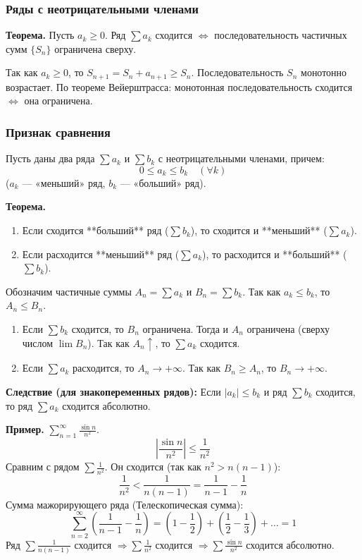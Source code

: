 \subsubsection*{Ряды с неотрицательными членами}
\textbf{Теорема.} Пусть $a_k \ge 0$. Ряд $\sum a_k$ сходится $\Leftrightarrow$ последовательность частичных сумм $\{S_n\}$ ограничена сверху.
\begin{tcolorbox}[title=Доказательство]
    Так как $a_k \ge 0$, то $S_{n+1} = S_n + a_{n+1} \ge S_n$.
    Последовательность $S_n$ монотонно возрастает.
    По теореме Вейерштрасса: монотонная последовательность сходится $\Leftrightarrow$ она ограничена.
\end{tcolorbox}

\subsubsection*{Признак сравнения}
Пусть даны два ряда $\sum a_k$ и $\sum b_k$ с неотрицательными членами, причем:
\[ 0 \le a_k \le b_k \quad (\forall k) \]
($a_k$ — «меньший» ряд, $b_k$ — «больший» ряд).

\textbf{Теорема.}
\begin{enumerate}
    \item Если сходится **больший** ряд ($\sum b_k$), то сходится и **меньший** ($\sum a_k$).
    \item Если расходится **меньший** ряд ($\sum a_k$), то расходится и **больший** ($\sum b_k$).
\end{enumerate}

\begin{tcolorbox}[title=Доказательство]
    Обозначим частичные суммы $A_n = \sum a_k$ и $B_n = \sum b_k$.
    Так как $a_k \le b_k$, то $A_n \le B_n$.
    \begin{enumerate}
        \item Если $\sum b_k$ сходится, то $B_n$ ограничена. Тогда и $A_n$ ограничена (сверху числом $\lim B_n$). Так как $A_n \uparrow$, то $\sum a_k$ сходится.
        \item Если $\sum a_k$ расходится, то $A_n \to +\infty$. Так как $B_n \ge A_n$, то $B_n \to +\infty$.
    \end{enumerate}
\end{tcolorbox}
 
\textbf{Следствие (для знакопеременных рядов):}
Если $|a_k| \le b_k$ и ряд $\sum b_k$ сходится, то ряд $\sum a_k$ сходится абсолютно.

\textbf{Пример.} $\sum_{n=1}^\infty \frac{\sin n}{n^2}$.
\[ \left| \frac{\sin n}{n^2} \right| \le \frac{1}{n^2} \]
Сравним с рядом $\sum \frac{1}{n^2}$. Он сходится (так как $n^2 > n(n-1)$):
\[ \frac{1}{n^2} < \frac{1}{n(n-1)} = \frac{1}{n-1} - \frac{1}{n} \]
Сумма мажорирующего ряда (Телескопическая сумма):
\[ \sum_{n=2}^\infty \left(\frac{1}{n-1} - \frac{1}{n}\right) = \left(1 - \frac{1}{2}\right) + \left(\frac{1}{2} - \frac{1}{3}\right) + \dots = 1 \]
Ряд $\sum \frac{1}{n(n-1)}$ сходится $\Rightarrow \sum \frac{1}{n^2}$ сходится $\Rightarrow \sum \frac{\sin n}{n^2}$ сходится абсолютно.
